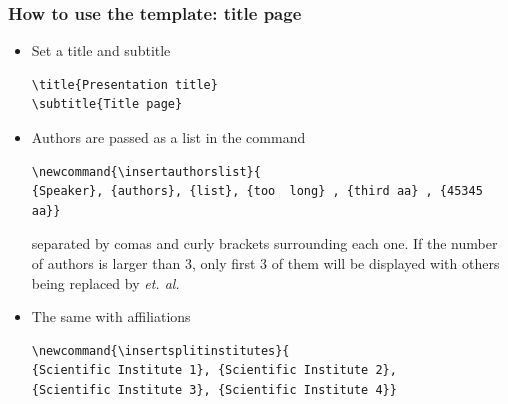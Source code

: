\documentclass[aspectratio=169, 18pt]{beamer}
\newcommand{\insertauthorslist}{
{Speaker}, {authors}, {list}, {too  long} , {third aa} , {45345 aa}
}
\newcommand{\insertsplitinstitutes}{
{Scientific Institute 1}, {Scientific Institute 2}, {Scientific Institute 3}, {Scientific Institute 4}
}
\begin{document}
	\FrameStyleTwo
	\begin{frame}[fragile]
		\frametitle{How to use the template: title page}
		\vspace{0.8cm}
		
		\begin{itemize}
		\item  Set a title and subtitle
		\begin{verbatim}
\title{Presentation title}
\subtitle{Title page}
		\end{verbatim}
		\item Authors are passed as a list in the command 
		\begin{verbatim}
\newcommand{\insertauthorslist}{
{Speaker}, {authors}, {list}, {too  long} , {third aa} , {45345 aa}}
		\end{verbatim}
		separated by comas and curly brackets surrounding each one. If the number of authors is larger than 3, only first 3 of them will be displayed with others being replaced by \textcolor{maingreen}{\textit{et. al.}}
		\item The same with affiliations
		\begin{verbatim}
\newcommand{\insertsplitinstitutes}{
{Scientific Institute 1}, {Scientific Institute 2},
{Scientific Institute 3}, {Scientific Institute 4}}
		\end{verbatim}
	\end{itemize}
		
	\end{frame}
\end{document}
